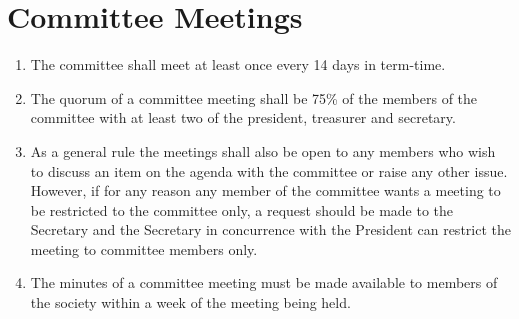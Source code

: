 \section{Committee Meetings}

\begin{enumerate}

\item The committee shall meet at least once every 14 days in term-time.

\item The quorum of a committee meeting shall be 75\% of the members of the committee with at least two of the president, treasurer and secretary.

\item As a general rule the meetings shall also be open to any members who wish to discuss an item on the agenda with the committee or raise any other issue. However, if for any reason any member of the committee wants a meeting to be restricted to the committee only, a request should be made to the Secretary and the Secretary in concurrence with the President can restrict the meeting to committee members only.

\item The minutes of a committee meeting must be made available to members of the society within a week of the meeting being held.

\end{enumerate}
